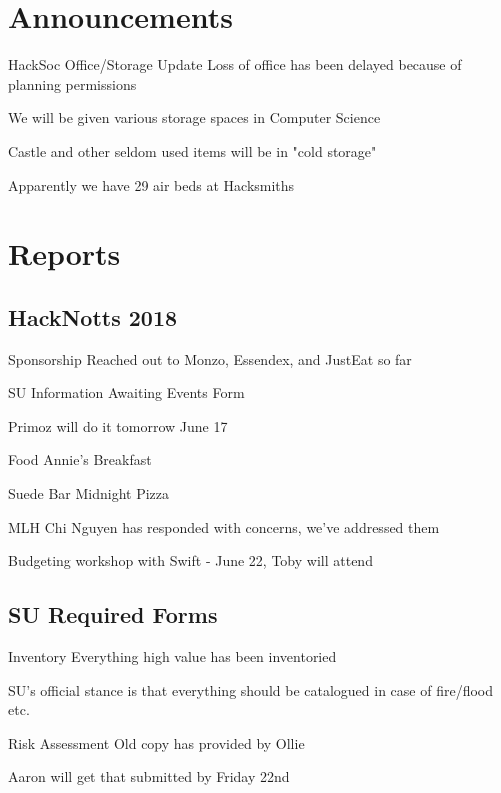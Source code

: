 \documentclass[11pt,hacksoc]{meetingmins}
\begin{document}
\maketitle

\section{Announcements}
\begin{items}
\item
HackSoc Office/Storage Update
	\subitem
	Loss of office has been delayed because of planning permissions
	
	\subitem
	We will be given various storage spaces in Computer Science
	
	\subitem
	Castle and other seldom used items will be in "cold storage"
	
	\subitem
	Apparently we have 29 air beds at Hacksmiths

\end{items}

\section{Reports}

\subsection{HackNotts 2018}
\begin{hiddensubitems}
	\item
	Sponsorship
		\subitem
		Reached out to Monzo, Essendex, and JustEat so far
	
	\item
	SU Information
		\subitem
		Awaiting Events Form
		
		\subitem
		Primoz will do it tomorrow June 17
	
	\item
	Food
		\subitem
		Annie's Breakfast
		
		\subitem
		Suede Bar Midnight Pizza
	
	\item
	MLH
		\subitem
		Chi Nguyen has responded with concerns, we've addressed them
		
		\subitem
		Budgeting workshop with Swift - June 22, Toby will attend
\end{hiddensubitems}


\subsection{SU Required Forms}
\begin{hiddensubitems}
	\item
	Inventory
		\subitem
		Everything high value has been inventoried
		
		\subitem
		SU's official stance is that everything should be catalogued in case of fire/flood etc.
	
	\item
	Risk Assessment
		\subitem
		Old copy has provided by Ollie
		
		\subitem
		Aaron will get that submitted by Friday 22nd
	
\end{hiddensubitems}
\end{document}
